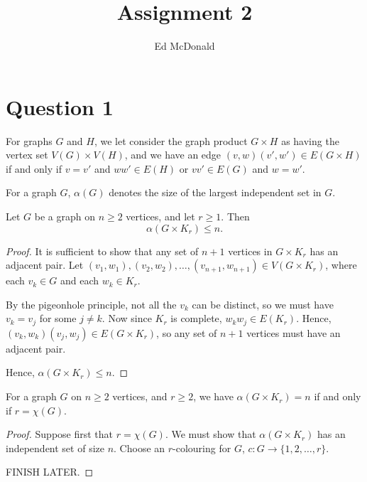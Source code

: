 \documentclass{unswmaths}
\begin{document}
\subject{Graph Theory}
\author{Ed McDonald}
\title{Assignment 2}


\setlength\parindent{0pt}


\unswtitle{}

\section*{Question 1}
For graphs $G$ and $H$, we let consider the graph
product $G\times H$ as having the vertex set $V(G)\times V(H)$,
and we have an edge $(v,w)(v',w') \in E(G\times H)$
if and only if $v = v'$ and $ww' \in E(H)$ or $vv' \in E(G)$ and $w = w'$. 

For a graph $G$, $\alpha(G)$ denotes the size of the largest independent
set in $G$.

\begin{lemma}[Part (a)]
    Let $G$ be a graph on $n \geq 2$ vertices, and let $r \geq 1$. Then
    \begin{equation*}
        \alpha(G \times K_r) \leq n.
    \end{equation*}     
\end{lemma}
\begin{proof}
    It is sufficient to show that any set of $n+1$ vertices
    in $G\times K_r$ has an adjacent pair. 
    Let $(v_1,w_1),(v_2,w_2),\ldots,(v_{n+1},w_{n+1}) \in V(G\times K_r)$,
    where each $v_k \in G$ and each $w_k \in K_r$. 
    
    By the pigeonhole principle, not all the $v_k$ can be distinct,
    so we must have $v_k = v_j$ for some $j \neq k$. Now since
    $K_r$ is complete, $w_kw_j \in E(K_r)$. Hence, $(v_k,w_k)(v_j,w_j) \in E(G\times K_r)$,
    so any set of $n+1$ vertices must have an adjacent pair.
    
    Hence, $\alpha(G\times K_r) \leq n$.    
\end{proof}

\begin{lemma}[Part (b)]
\label{1b}
    For a graph $G$ on $n \geq 2$ vertices, and $r \geq 2$, we have
    $\alpha(G\times K_r) = n$ if and only if $r = \chi(G)$.
\end{lemma}
\begin{proof}
    Suppose first that $r = \chi(G)$. We must show that $\alpha(G\times K_r)$
    has an independent set of size $n$. Choose an $r$-colouring
    for $G$, $c:G\to \{1,2,\ldots,r\}$. 
       
    FINISH LATER.
    
\end{proof}
\end{document}
